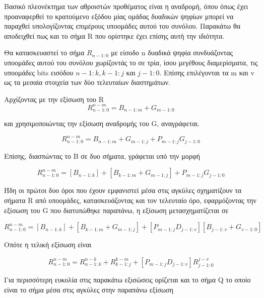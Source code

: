 Βασικό πλεονέκτημα των αθροιστών προθέματος είναι η αναδρομή, όπου όπως 
έχει προαναφερθεί το κρατούμενο εξόδου μίας ομάδας δυαδικών ψηφίων μπορεί
να παραχθεί υπολογίζοντας επιμέρους υποομάδες αυτού του συνόλου.
Παρακάτω θα αποδειχθεί πως και το σήμα R που ορίστηκε έχει 
επίσης αυτή την ιδιότητα.

Θα κατασκευαστεί το σήμα $R_{n-1:0}$ με είσοδο n δυαδικά ψηφία συνδυάζοντας
υποομάδες αυτού του συνόλου χωρίζοντάς το σε τρία, ίσου μεγέθους διαμερίσματα, τις υποομάδες bits εισόδου $n-1:k , k-1:j$ και $j-1:0$. Επίσης επιλέγονται τα m και v ως τα μεσαία στοιχεία των δύο τελευταίων διαστημάτων.
 

Αρχίζοντας με την εξίσωση του R %
\begin{equation*}
    R^{n-m}_{n-1:0} = B_{n-1:m} + G_{m-1:0}
\end{equation*}

και χρησιμοποιώντας την εξίσωση αναδρομής του G, αναγράφεται.

\begin{equation*}
    R^{n-m}_{n-1:0} = B_{n-1:m} + G_{m-1:j} + P_{m-1:j}G_{j-1:0}
\end{equation*}

Επίσης, διασπώντας το B σε δυο σήματα, γράφεται υπό την μορφή

\begin{equation*}
    R^{n-m}_{n-1:0} = [ B_{n-1:k} ] + [ B_{k-1:m} + G_{m-1:j} ] + P_{m-1:j}G_{j-1:0}
\end{equation*}

Ήδη οι πρώτοι δυο όροι που έχουν εμφανιστεί μέσα στις αγκύλες σχηματίζουν τα 
σήματα R από υποομάδες, κατασκευάζοντας και τον τελευταίο όρο, εφαρμόζοντας την
εξίσωση του G που διατυπώθηκε παραπάνω, η εξίσωση μετασχηματίζεται σε

\begin{equation*}
    R^{n-m}_{n-1:0} = [ B_{n-1:k} ] + [ B_{k-1:m} + G_{m-1:j} ] + [ P_{m-1:j}D_{j-1:v} ][B_{j-1:v}+G_{v-1:0}]
\end{equation*}

Οπότε η τελική εξίσωση είναι 

\begin{equation}
    R^{n-m}_{n-1:0} = R^{n-k}_{n-1:k} + R^{k-m}_{k-1:j} + [ P_{m-1:j}D_{j-1:v} ]R^{j-v}_{j-1:0}
\end{equation}

Για περισσότερη ευκολία στις παρακάτω εξισώσεις ορίζεται και το σήμα Q 
το οποίο είναι το σήμα μέσα στις αγκύλες στην παραπάνω εξίσωση  

